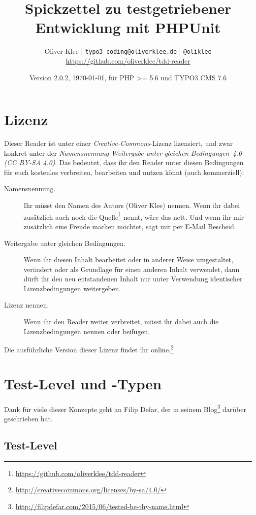 \documentclass[a4paper,10pt,headsepline]{scrartcl}
\author{
  Oliver Klee | \texttt{typo3-coding@oliverklee.de} | \texttt{@oliklee} \\
  \url{https://github.com/oliverklee/tdd-reader}
}
\date{Version 2.0.2, \today, für PHP >= 5.6 und TYPO3 CMS 7.6}
\title{
  Spickzettel zu testgetriebener Entwicklung mit PHPUnit
}
\begin{document}
\maketitle

\section*{Lizenz}

Dieser Reader ist unter einer \emph{Creative-Commons}-Lizenz lizensiert, und zwar konkret unter der \emph{Namensnennung-Weitergabe unter gleichen Bedingungen~4.0 (CC BY-SA 4.0)}. Das bedeutet, dass ihr den Reader unter diesen Bedingungen für euch kostenlos verbreiten, bearbeiten und nutzen könnt (auch kommerziell):

\begin{description}
  \item[Namensnennung.] Ihr müsst den Namen des Autors (Oliver Klee) nennen. Wenn ihr dabei zusätzlich auch noch die Quelle\footnote{\url{https://github.com/oliverklee/tdd-reader}} nennt, wäre das nett. Und wenn ihr mir zusätzlich eine Freude machen möchtet, sagt mir per E-Mail Bescheid.
  \item[Weitergabe unter gleichen Bedingungen.] Wenn ihr diesen Inhalt bearbeitet oder in anderer Weise umgestaltet, verändert oder als Grundlage für einen anderen Inhalt verwendet, dann dürft ihr den neu entstandenen Inhalt nur unter Verwendung identischer Lizenzbedingungen weitergeben.
  \item[Lizenz nennen.] Wenn ihr den Reader weiter verbreitet, müsst ihr dabei auch die Lizenzbedingungen nennen oder beifügen.
\end{description}

Die ausführliche Version dieser Lizenz findet ihr online.\footnote{\url{http://creativecommons.org/licenses/by-sa/4.0/}}


\pagebreak
\tableofcontents

\pagebreak
\section{Test-Level und -Typen}

Dank für viele dieser Konzepte geht an Filip Defar, der in seinem Blog\footnote{\url{http://filipdefar.com/2015/06/tested-be-thy-name.html}} darüber geschrieben hat.


\subsection{Test-Level}
\end{document}
